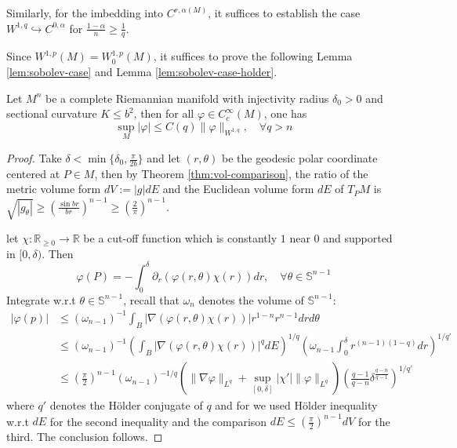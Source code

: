 Similarly, for the imbedding into \(C^{r,\alpha(M)}\), it suffices to establish the case
\(W^{1,q} \hookrightarrow C^{0,\alpha}\) for \(\frac{1-\alpha}{n}\geq \frac{1}{q}\).


Since \(W^{1,p}(M) = W^{1,p}_0(M)\), it suffices to prove the following Lemma
\ref{lem:sobolev-case} and Lemma \ref{lem:sobolev-case-holder}.

\begin{lemma}[\( W^{1,q} \hookrightarrow C^0_B \)]
\label{lem:sobolev-case}
Let \(M^n\) be a complete Riemannian manifold with injectivity radius \(\delta_0>0\)
and sectional curvature \(K\leq b^2\), then for all \(\varphi\in C_c^\infty(M)\), one
has
\[
\sup_M |\varphi| \leq C(q) \|\varphi\|_{W^{1,q}},\quad \forall q>n
\]
\end{lemma}
\begin{proof}
Take \(\delta <\min \{\delta_0, \frac{\pi}{2b}\}\) and let \((r,\theta)\) be the
geodesic polar coordinate centered at \(P\in M\), then by Theorem
\ref{thm:vol-comparison}, the ratio of the metric volume form \(dV:= |g|dE\) and the Euclidean
volume form \(dE\) of \(T_P M\) is \(\sqrt{|g_\theta|}\geq \left(\frac{\sin
br}{br}\right)^{n-1}\geq (\frac{2}{\pi})^{n-1}\). 

let \(\chi: \mathbb{R}_{\geq 0} \longrightarrow \mathbb{R}\) be a cut-off function which
is constantly \(1\) near \(0\) and supported in \([0,\delta)\). Then
\[
 \varphi(P) = -\int_0^\delta
\partial_r\left(\varphi(r,\theta)\chi(r)\right)dr,\quad\forall \theta\in \mathbb{S}^{n-1}
\]
Integrate w.r.t \(\theta\in \mathbb{S}^{n-1}\), recall that \(\omega_n\) denotes the
volume of \(\mathbb{S}^{n-1}\):
\begin{equation*}
\begin{split}
 \left|\varphi(p)\right| &\leq (\omega_{n-1})^{-1} \int_B \left| \nabla(\varphi(r,\theta)\chi(r)) \right| r^{1-n}r^{n-1}drd\theta \\
			&\leq (\omega_{n-1})^{-1} \left(\int_B \left| \nabla(\varphi(r,\theta)\chi(r)) \right|^q dE\right)^{1/q}\left(\omega_{n-1}\int_0^\delta r^{(n-1)(1-q)}dr\right)^{1/q'}\\
			&\leq (\frac{\pi}{2})^{n-1} (\omega_{n-1})^{-1/q} \left(\|\nabla\varphi\|_{L^q} + \sup_{[0,\delta]}|\chi'|\|\varphi\|_{L^q} \right) \left(\frac{q-1}{q-n}\delta^{\frac{q-n}{q-1}}\right)^{1/q'}
\end{split}   
\end{equation*}
where   \(q'\) denotes the Hölder conjugate of \(q\) and for we used Hölder inequality
w.r.t \(dE\) for the second inequality and the comparison \(dE \leq
(\frac{\pi}{2})^{n-1}dV\) for the third. The conclusion follows.
\end{proof}

